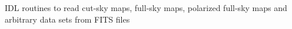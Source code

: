   \item[%
\htmlref{read\_fits\_cut4}{idl:read_fits_cut4},
\htmlref{read\_fits\_map}{idl:read_fits_map}]
  \item[%
\htmlref{read\_tqu}{idl:read_tqu},
\htmlref{read\_fits\_s}{idl:read_fits_s}]
\healpix IDL routines to read cut-sky maps, full-sky maps, polarized full-sky maps and
arbitrary data sets from FITS files
